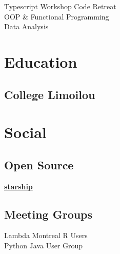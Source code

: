 \documentclass[letterpaper]{deedy-resume} %
\begin{document}
\begin{minipage}[t]{0.33\textwidth}
Typescript Workshop \textbullet{} Code Retreat \\
OOP \& Functional Programming \\
Data Analysis

\sectionspace %


\section{Education} 

\subsection{College Limoilou}


\sectionspace %


\section{Social}

\subsection{Open Source}

\href{https://starship.rs/}{\bf starship} \\

\sectionspace %

\subsection{Meeting Groups}

Lambda Montreal \textbullet{} R Users \\
Python \textbullet{} Java User Group

\sectionspace %


\end{minipage} %
\end{document}
